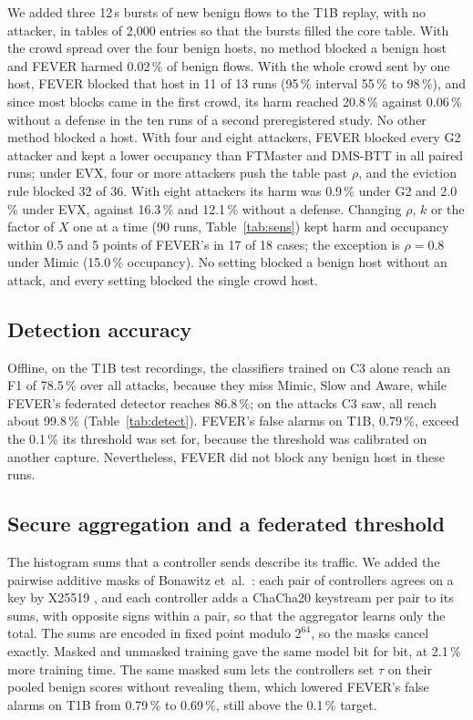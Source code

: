\documentclass[conference]{IEEEtran}
\begin{document}
We added three 12\,s bursts of new benign flows to the T1B replay, with no attacker, in tables of 2,000
entries so that the bursts filled the core table. With the crowd spread over the four benign hosts, no
method blocked a benign host and FEVER harmed 0.02\,\% of benign flows. With the whole crowd sent by one
host, FEVER blocked that host in 11 of 13 runs (95\,\% interval 55\,\% to 98\,\%), and since most blocks
came in the first crowd, its harm reached 20.8\,\% against 0.06\,\% without a defense in the ten runs of
a second preregistered study. No other method blocked a host. With four and eight attackers, FEVER
blocked every G2 attacker and kept a lower occupancy than FTMaster and DMS-BTT in all paired runs; under
EVX, four or more attackers push the table past $\rho$, and the eviction rule blocked 32 of 36. With
eight attackers its harm was 0.9\,\% under G2 and 2.0\,\% under EVX, against 16.3\,\% and 12.1\,\%
without a defense. Changing $\rho$, $k$ or the factor of $X$ one at a time (90 runs,
Table~\ref{tab:sens}) kept harm and occupancy within 0.5 and 5 points of FEVER's in 17 of 18 cases; the
exception is $\rho = 0.8$ under Mimic (15.0\,\% occupancy). No setting blocked a benign host without an
attack, and every setting blocked the single crowd host.

\subsection{Detection accuracy}

Offline, on the T1B test recordings, the classifiers trained on C3 alone reach an F1 of 78.5\,\% over
all attacks, because they miss Mimic, Slow and Aware, while FEVER's federated detector reaches 86.8\,\%;
on the attacks C3 saw, all reach about 99.8\,\% (Table~\ref{tab:detect}). FEVER's false alarms on T1B,
0.79\,\%, exceed the 0.1\,\% its threshold was set for, because the threshold was calibrated on another
capture. Nevertheless, FEVER did not block any benign host in these runs.

\subsection{Secure aggregation and a federated threshold}
\label{sec:secagg}

The histogram sums that a controller sends describe its traffic. We added the pairwise additive masks of
Bonawitz et~al.\ \cite{bonawitz2017secagg}: each pair of controllers agrees on a key by X25519
\cite{rfc7748}, and each controller adds a ChaCha20 \cite{rfc8439} keystream per pair to its sums, with
opposite signs within a pair, so that the aggregator learns only the total. The sums are encoded in fixed
point modulo $2^{64}$, so the masks cancel exactly. Masked and unmasked training gave the same model bit
for bit, at 2.1\,\% more training time. The same masked sum lets the controllers set $\tau$ on their
pooled benign scores without revealing them, which lowered FEVER's false alarms on T1B from 0.79\,\% to
0.69\,\%, still above the 0.1\,\% target.
\end{document}
